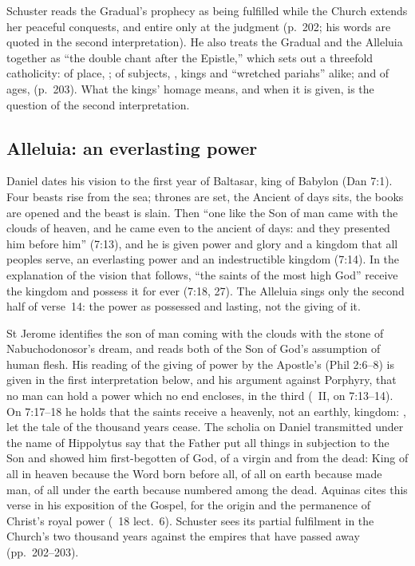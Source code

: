 Schuster reads the Gradual's prophecy as being fulfilled while the Church
extends her peaceful conquests, and entire only at the judgment (p.~202; his
words are quoted in the second interpretation). He also treats the Gradual and the
Alleluia together as ``the double chant after the Epistle,'' which sets out a
threefold
catholicity: of place, ; of subjects, , kings and ``wretched pariahs'' alike; and of ages,
 (p.~203). What the kings' homage
means, and when it is given, is the question of the second interpretation.

\subsection{Alleluia: an everlasting power}
\label{sec:element-alleluia}

Daniel dates his vision to the first year of Baltasar, king of Babylon (Dan
7:1). Four beasts rise from the sea; thrones are set, the Ancient of days sits,
the books are opened and the beast is slain. Then ``one like the Son of man
came with the clouds of heaven, and he came even to the ancient of days: and
they presented him before him'' (7:13), and he is given power and glory and a
kingdom that all peoples serve, an everlasting power and an indestructible
kingdom (7:14). In the explanation of the vision that follows, ``the saints of the most high God''
receive the kingdom and possess it for ever (7:18, 27). The Alleluia sings only
the second half of verse~14: the power as possessed and lasting, not the
giving of it.

St Jerome identifies the son of man coming with the clouds with the stone of
Nabuchodonosor's dream, and reads both of the Son of God's
assumption of human flesh. His reading of the giving of power by the
Apostle's  (Phil 2:6--8) is given in the
first interpretation below, and his argument against Porphyry, that no man can
hold a power which no end encloses, in the third (\ II, on 7:13--14). On
7:17--18 he holds that the saints receive a heavenly, not an earthly, kingdom:
, let the tale of the thousand years
cease. The scholia on Daniel transmitted under the name of Hippolytus say that
the Father put all things in subjection to the Son and showed him
first-begotten of God, of a virgin and from the dead: King of all in heaven
because the Word born before all, of all on earth because made man, of all
under the earth because numbered among the dead. Aquinas cites this verse in
his exposition of the Gospel, for the origin and the permanence of Christ's
royal power (\ 18 lect.~6). Schuster sees its partial
fulfilment in the Church's two thousand years against the empires that have
passed away (pp.~202--203).

